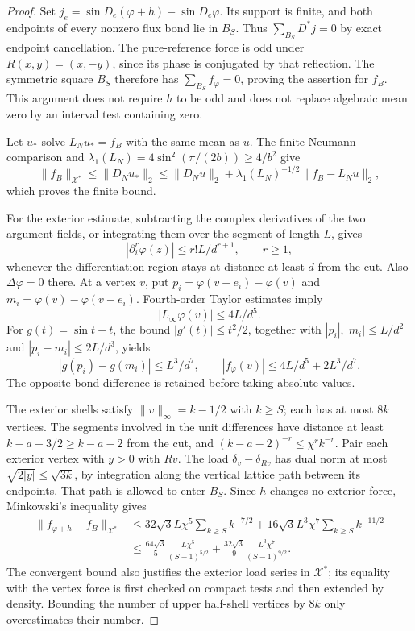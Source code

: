 \begin{proof}
Set $j_e=\sin D_e(\varphi+h)-\sin D_e\varphi$. Its support is finite,
and both endpoints of every nonzero flux bond lie in $B_S$. Thus
$\sum_{B_S}D^*j=0$ by exact endpoint cancellation. The pure-reference force
is odd under $R(x,y)=(x,-y)$, since its phase is conjugated by that
reflection. The symmetric square $B_S$ therefore has
$\sum_{B_S}f_\varphi=0$, proving the assertion for $f_B$. This argument
does not require $h$ to be odd and does not replace algebraic mean zero
by an interval test containing zero.

Let $u_*$ solve $L_Nu_*=f_B$ with the same mean as $u$. The finite Neumann
comparison and $\lambda_1(L_N)=4\sin^2(\pi/(2b))\ge4/b^2$ give
\[
 \|f_B\|_{\mathcal X^*}
 \le\|D_Nu_*\|_2
 \le\|D_Nu\|_2+\lambda_1(L_N)^{-1/2}\|f_B-L_Nu\|_2,
\]
which proves the finite bound.

For the exterior estimate, subtracting the complex derivatives of the two
argument fields, or integrating them over the segment of length $L$,
gives
\[
 |\partial_i^r\varphi(z)|\le r! L/d^{r+1},\qquad r\ge1,
\]
whenever the differentiation region stays at distance at least $d$ from
the cut. Also $\Delta\varphi=0$ there. At a vertex $v$, put
$p_i=\varphi(v+e_i)-\varphi(v)$ and
$m_i=\varphi(v)-\varphi(v-e_i)$. Fourth-order Taylor estimates imply
\[
 |L_\infty\varphi(v)|\le4L/d^5.
\]
For $g(t)=\sin t-t$, the bound $|g'(t)|\le t^2/2$, together with
$|p_i|,|m_i|\le L/d^2$ and $|p_i-m_i|\le2L/d^3$, yields
\[
 |g(p_i)-g(m_i)|\le L^3/d^7,
 \qquad |f_\varphi(v)|\le4L/d^5+2L^3/d^7.
\]
The opposite-bond difference is retained before taking absolute values.

The exterior shells satisfy $\|v\|_\infty=k-1/2$ with $k\ge S$; each
has at most $8k$ vertices. The segments involved in the unit differences
have distance at least $k-a-3/2\ge k-a-2$ from the cut, and
$(k-a-2)^{-r}\le\chi^r k^{-r}$. Pair each exterior vertex with $y>0$
with $Rv$. The load $\delta_v-\delta_{Rv}$ has dual norm at most
$\sqrt{2|y|}\le\sqrt{3k}$, by integration along the vertical lattice
path between its endpoints. That path is allowed to enter $B_S$.
Since $h$ changes no exterior force, Minkowski's inequality gives
\begin{align*}
 \|f_{\varphi+h}-f_B\|_{\mathcal X^*}
 &\le32\sqrt3 L\chi^5\sum_{k\ge S}k^{-7/2}
       +16\sqrt3 L^3\chi^7\sum_{k\ge S}k^{-11/2}\\
 &\le\frac{64\sqrt3}{5}\frac{L\chi^5}{(S-1)^{5/2}}
       +\frac{32\sqrt3}{9}\frac{L^3\chi^7}{(S-1)^{9/2}}.
\end{align*}
The convergent bound also justifies the exterior load series in
$\mathcal X^*$; its equality with the vertex force is first checked on
compact tests and then extended by density. Bounding the number of upper
half-shell vertices by $8k$ only overestimates their number.
\end{proof}

